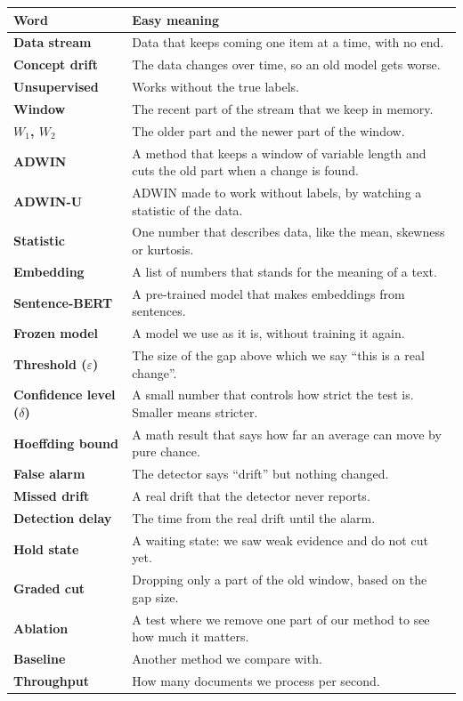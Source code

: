 \documentclass[11pt,a4paper]{article}
\begin{document}
\begin{center}
\small
\begin{tabular}{@{}>{\bfseries}p{3.4cm}p{9.8cm}@{}}
\toprule
Word & Easy meaning \\
\midrule
Data stream & Data that keeps coming one item at a time, with no end. \\
Concept drift & The data changes over time, so an old model gets worse. \\
Unsupervised & Works without the true labels. \\
Window & The recent part of the stream that we keep in memory. \\
$W_1$, $W_2$ & The older part and the newer part of the window. \\
ADWIN & A method that keeps a window of variable length and cuts the old part when a change is found. \\
ADWIN-U & ADWIN made to work without labels, by watching a statistic of the data. \\
Statistic & One number that describes data, like the mean, skewness or kurtosis. \\
Embedding & A list of numbers that stands for the meaning of a text. \\
Sentence-BERT & A pre-trained model that makes embeddings from sentences. \\
Frozen model & A model we use as it is, without training it again. \\
Threshold ($\varepsilon$) & The size of the gap above which we say ``this is a real change''. \\
Confidence level ($\delta$) & A small number that controls how strict the test is. Smaller means stricter. \\
Hoeffding bound & A math result that says how far an average can move by pure chance. \\
False alarm & The detector says ``drift'' but nothing changed. \\
Missed drift & A real drift that the detector never reports. \\
Detection delay & The time from the real drift until the alarm. \\
Hold state & A waiting state: we saw weak evidence and do not cut yet. \\
Graded cut & Dropping only a part of the old window, based on the gap size. \\
Ablation & A test where we remove one part of our method to see how much it matters. \\
Baseline & Another method we compare with. \\
Throughput & How many documents we process per second. \\
\bottomrule
\end{tabular}
\end{center}
\end{document}
